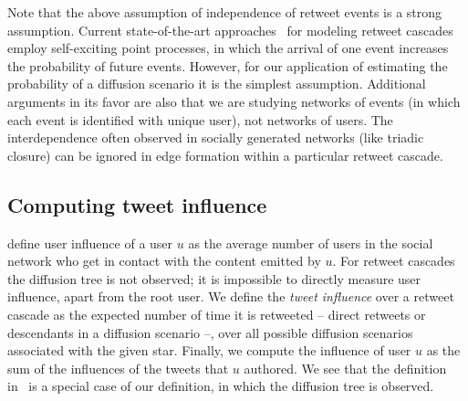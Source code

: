 Note that the above assumption of independence of retweet events is a strong assumption.
Current state-of-the-art approaches~\cite{Mishra2016,Zhao2015} for modeling retweet cascades employ self-exciting point processes, in which the arrival of one event increases the probability of future events.
However, for our application of estimating the probability of a diffusion scenario it is the simplest assumption.
Additional arguments in its favor are also that we are studying networks of events
(in which each event is identified with unique user), not networks of users. 
The interdependence often observed in socially generated networks (like triadic closure)
can be ignored in edge formation within a particular retweet cascade. 



\subsection{Computing tweet influence}
\label{subsec:user-influence}

\cite{Du2013} define user influence of a user $u$ as the average number of users in the social network who get in contact with the content emitted by $u$.
For retweet cascades the diffusion tree is not observed; it is impossible to directly measure user influence, apart from the root user.
We define the \emph{tweet influence} over a retweet cascade as the expected number of time it is retweeted -- direct retweets or descendants in a diffusion scenario --, over all possible diffusion scenarios associated with the given star.
Finally, we compute the influence of user $u$ as the sum of the influences of the tweets that $u$ authored.
We see that the definition in~\cite{Du2013} is a special case of our definition, in which the diffusion tree is observed.

